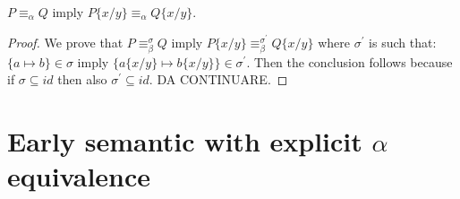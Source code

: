\begin{lemma}
  $P\equiv_{\alpha}Q$ imply $P\{x/y\} \equiv_{\alpha} Q\{x/y\}$.
  \begin{proof}
    We prove that $P\equiv_{\beta}^{\sigma}Q$ imply $P\{x/y\} \equiv_{\beta}^{\sigma^{'}} Q\{x/y\}$ where $\sigma^{'}$ is such that:
    $\{a\mapsto b\} \in \sigma$ imply $\{a\{x/y\}\mapsto b\{x/y\}\} \in \sigma^{'}$. Then the conclusion follows because if $\sigma\subseteq id$ then also $\sigma^{'}\subseteq id$.
    DA CONTINUARE.
  \end{proof}
\end{lemma}


\section{Early semantic with explicit $\alpha$ equivalence}

